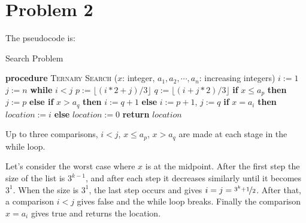 \documentclass[10pt]{article}
\begin{document}
\section*{Problem 2}
The pseudocode is:
\begin{algorithm}[H]
    \caption{Search Problem}
    \begin{algorithmic}[1]
        \State \textbf{procedure} \textsc{Ternary Search} ($x$: integer, $a_1, a_2, \cdots , a_n$: increasing integers)
            \State \hspace{0.53cm}$i := 1$ 
            \State \hspace{0.53cm}$j := n$ 
            \State \hspace{0.53cm}\textbf{while} {$i < j$}
                \State \hspace{1.06cm}$p := \lfloor(i * 2 + j) / 3\rfloor$ 
                \State \hspace{1.06cm}$q := \lfloor(i + j * 2) / 3\rfloor$ 
                \State \hspace{1.06cm}\textbf{if} $x \leq a_p$ \textbf{then} $j := p$
                \State \hspace{1.06cm}\textbf{else if} $x > a_q$ \textbf{then} $i := q + 1$
                \State \hspace{1.06cm}\textbf{else} $i := p + 1$, $j := q$
            \State \hspace{0.53cm}\textbf{if} $x = a_i$ \textbf{then} $location := i$
            \State \hspace{0.53cm}\textbf{else} $location := 0$
            \State \hspace{0.53cm}\textbf{return} $location$ 
    \end{algorithmic}
\end{algorithm}
Up to three comparisons, $i < j$, $x \leq a_p$, $x > a_q$ are made at each stage in the while loop. 

\vspace{0.3cm} Let's consider the worst case where $x$ is at the midpoint. 
After the first step the size of the list is $3^{k-1}$, and after each step it decreases similarly until it becomes $3^1$.
When the size is $3^1$, the last step occurs and gives $i = j = \nicefrac{3^k+1}{2}$. 
After that, a comparison $i < j$ gives false and the while loop breaks. Finally the comparison $x=a_i$ gives true and returns the location.
\end{document}
